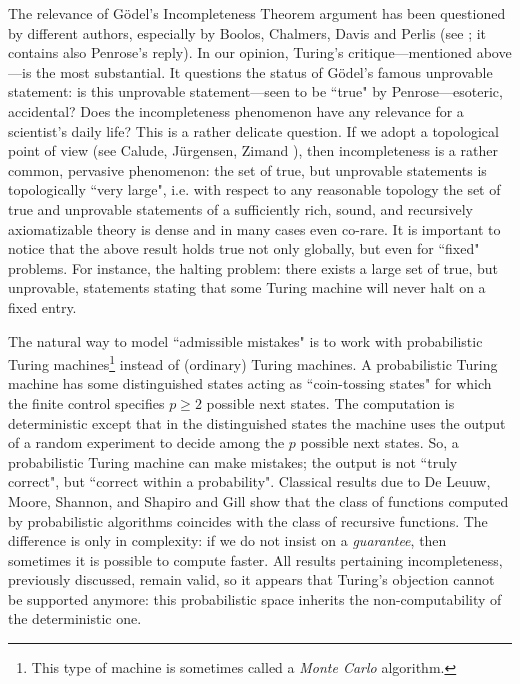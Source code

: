 The relevance of G\" odel's Incompleteness Theorem \cite{goedel}
 argument has been
questioned by different authors, especially by
Boolos, Chalmers, Davis and Perlis (see \cite{penrose0}; it contains also
Penrose's reply).
In our opinion, Turing's critique---mentioned above---is the most
substantial. It
questions the status of G\" odel's  famous unprovable statement: is this
unprovable
statement---seen to be ``true" by Penrose---esoteric, accidental? Does
the incompleteness  phenomenon have any relevance
for a scientist's daily life?  This is a rather delicate
question. If we adopt a topological  point of view (see Calude, J\"
urgensen, Zimand \cite{cjz}), then
incompleteness is a rather common, pervasive phenomenon: the set of true,
but unprovable
statements is topologically ``very large", i.e. with respect
 to any reasonable topology
the set of true and unprovable statements of a sufficiently rich,
sound, and recursively axiomatizable theory
is dense and in many cases even co-rare. It is important to notice that
the above result holds true not only globally, but even for
``fixed" problems. For instance, the  halting problem: there exists
a large set of  true, but unprovable, statements stating that some Turing
machine
will never halt on a fixed entry.

The natural way to model ``admissible mistakes" is to work with
probabilistic Turing
machines\footnote{This type of machine is sometimes called a {\it Monte
Carlo} algorithm.}
instead of (ordinary) Turing machines. A probabilistic Turing machine has
some distinguished states acting as ``coin-tossing states" for which
the finite control   specifies $p \geq 2$ possible next states. The
computation is
deterministic except that in the distinguished states the machine uses the
output of a random
experiment to decide among the $p$ possible next states. So, a
probabilistic Turing machine
can make mistakes; the output is not ``truly correct", but ``correct within
a probability".
Classical results
due to   De Leuuw,  Moore,  Shannon, and Shapiro \cite{dmss} and Gill
\cite{gill}
show that   the class of functions computed by
probabilistic algorithms  coincides with the class of
recursive functions. The difference is only in complexity: if we do not
insist on a
{\it guarantee}, then sometimes it is possible to compute faster. All
results pertaining
incompleteness,   previously discussed, remain valid, so  it appears that
Turing's
objection cannot be supported anymore: this probabilistic space inherits the
non-computability of the deterministic one.


